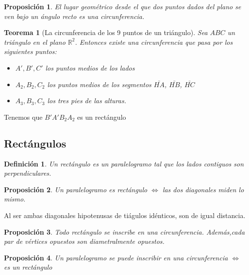 \documentclass[11pt, a4paper, titlepage]{article}
\makeatletter
\renewenvironment{proof}[1][\proofname] {\vspace{-15pt}\par\pushQED{\qed}\normalfont\topsep6\p@\@plus6\p@\relax\trivlist\item[\hskip\labelsep\it#1\@addpunct{.}]\ignorespaces}{\popQED\endtrivlist\@endpefalse}
\newcommand{\R}{\mathbb{R}}
\theoremstyle{theorem-style}
\newtheorem*{nth}{Teorema}
\newtheorem*{nprop}{Proposición}
\theoremstyle{definition-style}
\newtheorem*{ndef}{Definición}
\theoremstyle{remark-style}
\theoremstyle{example-style}
\makeatother
\begin{document}
\begin{nprop}
  El lugar geométrico desde el que dos puntos dados del plano se ven bajo un ángulo recto es una circunferencia.
\end{nprop}

\begin{nth}[La circunferencia de los 9 puntos de un triángulo]
  Sea $ABC$ un triángulo en el plano $\R^2$. Entonces existe una circunferencia que pasa por los siguientes puntos:
  \begin{itemize}
  \item $A',B',C'$ los puntos medios de los lados
  \item $A_2,B_2,C_2$ los puntos medios de los segmentos $\bar{HA}$, $\bar{HB}$, $\bar{HC}$
  \item $A_3,B_3,C_3$ los tres pies de las alturas.
  \end{itemize}
\end{nth}
\begin{proof}
  Tenemos que $B'A'B_2A_2$ es un rectángulo
\end{proof}



\subsection{Rectángulos}
\begin{ndef}
  Un rectángulo es un paralelogramo tal que los lados contiguos son perpendiculares.
\end{ndef}


\begin{nprop}
  Un paralelogramo es rectángulo $\iff$ las dos diagonales miden lo mismo.
\end{nprop}
\begin{proof}
  \boxed{$\Rightarrow$}
  Al ser ambas diagonales hipotenusas de tiágulos idénticos, son de igual distancia.
  \boxed{$\Leftarrow$}
  
\end{proof}

\begin{nprop}
  Todo rectángulo se inscribe en una circunferencia. Además,cada par de vértices opuestos son diametralmente opuestos.
\end{nprop}

\begin{nprop}
  Un paralelogramo se puede inscribir en una circunferencia $\iff$ es un rectángulo
\end{nprop}
\end{document}
